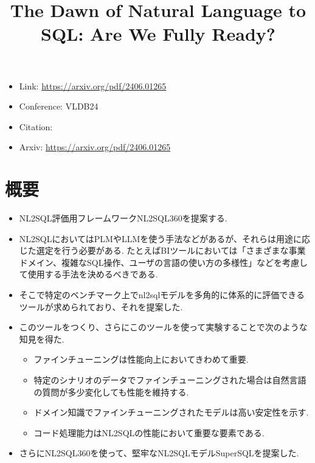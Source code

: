 \documentclass[dvipdfmx,uplatex]{jsarticle}
\title{The Dawn of Natural Language to SQL: Are We Fully Ready?}
\author{\empty}
\date{\empty}
\theoremstyle{remark}
\newenvironment{simplebox}{
    \begin{tcolorbox}[
        fonttitle=\bfseries,
    ]
}{
    \end{tcolorbox}
}
\begin{document}
\maketitle

\begin{itemize}
    \item Link: \url{https://arxiv.org/pdf/2406.01265}
    \item Conference: VLDB24
    \item Citation: \cite{dawn_nl2sql}
    \item Arxiv: \url{https://arxiv.org/pdf/2406.01265}
\end{itemize}

\section{概要}
\begin{simplebox}
\begin{itemize}
    \item NL2SQL評価用フレームワークNL2SQL360を提案する.
    \item NL2SQLにおいてはPLMやLLMを使う手法などがあるが、それらは用途に応じた選定を行う必要がある. たとえばBIツールにおいては「さまざまな事業ドメイン、複雑なSQL操作、ユーザの言語の使い方の多様性」などを考慮して使用する手法を決めるべきである.
    \item そこで特定のベンチマーク上でnl2sqlモデルを多角的に体系的に評価できるツールが求められており、それを提案した.
    \item このツールをつくり、さらにこのツールを使って実験することで次のような知見を得た.
    \begin{itemize}
        \item ファインチューニングは性能向上においてきわめて重要.
        \item 特定のシナリオのデータでファインチューニングされた場合は自然言語の質問が多少変化しても性能を維持する.
        \item ドメイン知識でファインチューニングされたモデルは高い安定性を示す.
        \item コード処理能力はNL2SQLの性能において重要な要素である.
    \end{itemize}
    \item さらにNL2SQL360を使って、堅牢なNL2SQLモデルSuperSQLを提案した.
\end{itemize}
\end{simplebox}
\end{document}

